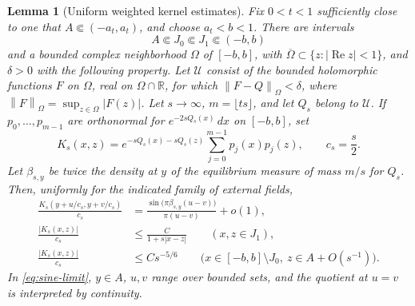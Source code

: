 \documentclass[11pt]{article}
\newtheorem{lemma}[theorem]{Lemma}
\theoremstyle{definition}
\numberwithin{equation}{section}
\newcommand{\R}{\mathbb R}
\newcommand{\norm}[1]{\left\lVert #1\right\rVert}
\begin{document}
\begin{lemma}[Uniform weighted kernel estimates]\label{lem:kssv-kernel}
Fix \(0<t<1\) sufficiently close to one that \(A\Subset(-a_t,a_t)\),
and choose \(a_t<b<1\). There are intervals
\[
 A\Subset J_0\Subset J_1\Subset(-b,b)
\]
and a bounded complex neighborhood \(\Omega\) of \([-b,b]\), with
\(\overline\Omega\subset\{z:|\operatorname{Re}z|<1\}\), and
\(\delta>0\) with the following property.
Let \(\mathcal U\) consist of the bounded holomorphic functions \(F\)
on \(\Omega\), real on \(\Omega\cap\R\), for which
\(\norm{F-Q}_\Omega<\delta\), where
\(\norm{F}_\Omega=\sup_{z\in\Omega}|F(z)|\).
Let \(s\to\infty\), \(m=\lfloor ts\rfloor\), and let \(Q_s\) belong
to \(\mathcal U\). If \(p_0,\ldots,p_{m-1}\) are orthonormal for
\(e^{-2sQ_s(x)}\,dx\) on \([-b,b]\), set
\begin{equation}\label{eq:kernel}
 K_s(x,z)=e^{-sQ_s(x)-sQ_s(z)}
 \sum_{j=0}^{m-1}p_j(x)p_j(z),
 \qquad c_s=\frac{s}{2}.
\end{equation}
Let \(\beta_{s,y}\) be twice the density at \(y\) of the equilibrium
measure of mass \(m/s\) for \(Q_s\). Then, uniformly for the indicated
family of external fields,
\begin{align}
 \frac{K_s(y+u/c_s,y+v/c_s)}{c_s}
 &=\frac{\sin\bigl(\pi\beta_{s,y}(u-v)\bigr)}{\pi(u-v)}+o(1),
 \label{eq:sine-limit}\\
 \frac{|K_s(x,z)|}{c_s}
 &\le \frac{C}{1+s|x-z|}
 \qquad (x,z\in J_1), \label{eq:bulk-kernel}\\
 \frac{|K_s(x,z)|}{c_s}
 &\le Cs^{-5/6}
 \qquad\bigl(x\in[-b,b]\setminus J_0,\
 z\in A+O(s^{-1})\bigr). \label{eq:edge-kernel}
\end{align}
In \eqref{eq:sine-limit}, \(y\in A\), \(u,v\) range over bounded
sets, and the quotient at \(u=v\) is interpreted by continuity.
\end{lemma}
\end{document}
